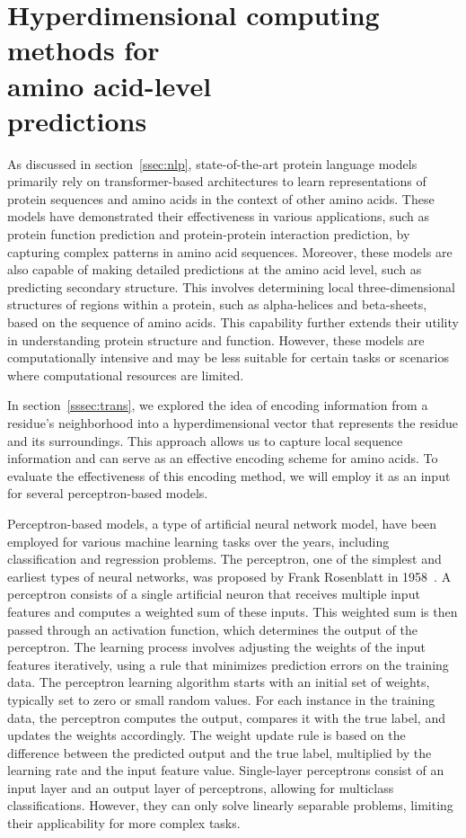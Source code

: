 \chapter[Methods for amino acid-level predictions]{Hyperdimensional computing methods for\\amino acid-level\\predictions}
As discussed in section~\ref{ssec:nlp}, state-of-the-art protein language models primarily rely on transformer-based architectures to learn representations of protein sequences and amino acids in the context of other amino acids. These models have demonstrated their effectiveness in various applications, such as protein function prediction and protein-protein interaction prediction, by capturing complex patterns in amino acid sequences. Moreover, these models are also capable of making detailed predictions at the amino acid level, such as predicting secondary structure. This involves determining local three-dimensional structures of regions within a protein, such as alpha-helices and beta-sheets, based on the sequence of amino acids. This capability further extends their utility in understanding protein structure and function. However, these models are computationally intensive and may be less suitable for certain tasks or scenarios where computational resources are limited.

In section~\ref{sssec:trans}, we explored the idea of encoding information from a residue's neighborhood into a hyperdimensional vector that represents the residue and its surroundings. This approach allows us to capture local sequence information and can serve as an effective encoding scheme for amino acids. To evaluate the effectiveness of this encoding method, we will employ it as an input for several perceptron-based models.

Perceptron-based models, a type of artificial neural network model, have been employed for various machine learning tasks over the years, including classification and regression problems. The perceptron, one of the simplest and earliest types of neural networks, was proposed by Frank Rosenblatt in 1958~\cite{perceptron}. A perceptron consists of a single artificial neuron that receives multiple input features and computes a weighted sum of these inputs. This weighted sum is then passed through an activation function, which determines the output of the perceptron. The learning process involves adjusting the weights of the input features iteratively, using a rule that minimizes prediction errors on the training data. The perceptron learning algorithm starts with an initial set of weights, typically set to zero or small random values. For each instance in the training data, the perceptron computes the output, compares it with the true label, and updates the weights accordingly. The weight update rule is based on the difference between the predicted output and the true label, multiplied by the learning rate and the input feature value. Single-layer perceptrons consist of an input layer and an output layer of perceptrons, allowing for multiclass classifications. However, they can only solve linearly separable problems, limiting their applicability for more complex tasks.

